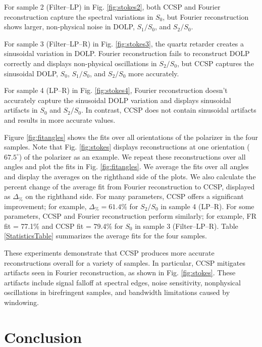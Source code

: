 \documentclass[10pt]{article}
\numberwithin{equation}{subsection}
\begin{document}
    For sample 2 (Filter--LP) in Fig. \ref{fig:stokes2}, both CCSP and Fourier reconstruction capture the spectral variations in $S_0$, but Fourier reconstruction shows larger, non-physical noise in DOLP, $S_1 / S_0$, and $S_2 / S_0$.

    For sample 3 (Filter--LP--R) in Fig. \ref{fig:stokes3}, the quartz retarder creates a sinusoidal variation in DOLP.
    Fourier reconstruction fails to reconstruct DOLP correctly and displays non-physical oscillations in $S_2 / S_0$, but CCSP captures the sinusoidal DOLP, $S_0$, $S_1 / S_0$, and $S_2 / S_0$ more accurately.

    For sample 4 (LP--R) in Fig. \ref{fig:stokes4}, Fourier reconstruction doesn't accurately capture the sinusoidal DOLP variation and displays sinusoidal artifacts in $S_0$ and $S_2 / S_0$.
    In contrast, CCSP does not contain sinusoidal artifacts and results in more accurate values.

    Figure \ref{fig:fitangles} shows the fits over all orientations of the polarizer in the four samples.
    Note that Fig. \ref{fig:stokes} displays reconstructions at one orientation ($67.5^\circ$) of the polarizer as an example.
    We repeat these reconstructions over all angles and plot the fits in Fig. \ref{fig:fitangles}.
    We average the fits over all angles and display the averages on the righthand side of the plots.
    We also calculate the percent change of the average fit from Fourier reconstruction to CCSP, displayed as $\Delta_{\%}$ on the righthand side.
    For many parameters, CCSP offers a significant improvement; for example, $\Delta_{\%} = 61.4\%$ for $S_2 / S_0$ in sample 4 (LP--R).
    For some parameters, CCSP and Fourier reconstruction perform similarly; for example, FR fit = 77.1\% and CCSP fit = 79.4\% for $S_0$ in sample 3 (Filter--LP--R).
    Table \ref{StatisticsTable} summarizes the average fits for the four samples.

    These experiments demonstrate that CCSP produces more accurate reconstructions overall for a variety of samples.
    In particular, CCSP mitigates artifacts seen in Fourier reconstruction, as shown in Fig. \ref{fig:stokes}.
    These artifacts include signal falloff at spectral edges, noise sensitivity, nonphysical oscillations in birefringent samples, and bandwidth limitations caused by windowing.

\section{Conclusion}
\end{document}
